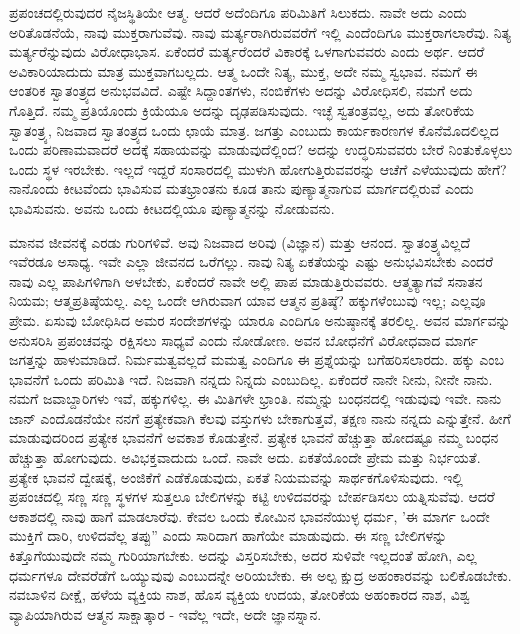 ಪ್ರಪಂಚದಲ್ಲಿರುವುದರ ನೈಜಸ್ಥಿತಿಯೇ ಆತ್ಮ. ಆದರೆ ಅದೆಂದಿಗೂ ಪರಿಮಿತಿಗೆ ಸಿಲುಕದು. ನಾವೇ ಅದು ಎಂದು ಅರಿತೊಡನೆಯೆ, ನಾವು ಮುಕ್ತರಾಗುವೆವು. ನಾವು ಮರ್ತ್ಯರಾಗಿರುವವರೆಗೆ ಇಲ್ಲಿ ಎಂದೆಂದಿಗೂ ಮುಕ್ತರಾಗಲಾರೆವು. ನಿತ್ಯ ಮರ್ತ್ಯರೆನ್ನುವುದು ವಿರೋಧಾಭಾಸ. ಏಕೆಂದರೆ ಮರ್ತ್ಯರೆಂದರೆ ವಿಕಾರಕ್ಕೆ ಒಳಗಾಗುವವರು ಎಂದು ಅರ್ಥ. ಆದರೆ ಅವಿಕಾರಿಯಾದುದು ಮಾತ್ರ ಮುಕ್ತವಾಗಬಲ್ಲದು. ಆತ್ಮ ಒಂದೇ ನಿತ್ಯ, ಮುಕ್ತ, ಅದೇ ನಮ್ಮ ಸ್ವಭಾವ. ನಮಗೆ ಈ ಆಂತರಿಕ ಸ್ವಾತಂತ್ರ್ಯದ ಅನುಭವವಿದೆ. ಎಷ್ಟೇ ಸಿದ್ದಾಂತಗಳು, ನಂಬಿಕೆಗಳು ಅದನ್ನು ವಿರೋಧಿಸಲಿ, ನಮಗೆ ಅದು ಗೊತ್ತಿದೆ. ನಮ್ಮ ಪ್ರತಿಯೊಂದು ಕ್ರಿಯೆಯೂ ಅದನ್ನು ದೃಢಪಡಿಸುವುದು. ಇಚ್ಛೆ ಸ್ವತಂತ್ರವಲ್ಲ, ಅದು ತೋರಿಕೆಯ ಸ್ವಾತಂತ್ರ್ಯ, ನಿಜವಾದ ಸ್ವಾತಂತ್ರ್ಯದ ಒಂದು ಛಾಯೆ ಮಾತ್ರ. ಜಗತ್ತು ಎಂಬುದು ಕಾರ್ಯಕಾರಣಗಳ ಕೊನೆಮೊದಲಿಲ್ಲದ ಒಂದು ಪರಿಣಾಮವಾದರೆ ಅದಕ್ಕೆ ಸಹಾಯವನ್ನು ಮಾಡುವುದೆಲ್ಲಿಂದ? ಅದನ್ನು ಉದ್ಧರಿಸುವವರು ಬೇರೆ ನಿಂತುಕೊಳ್ಳಲು ಒಂದು ಸ್ಥಳ ಇರಬೇಕು. ಇಲ್ಲದೆ ಇದ್ದರೆ ಸಂಸಾರದಲ್ಲಿ ಮುಳುಗಿ ಹೋಗುತ್ತಿರುವವರನ್ನು ಆಚೆಗೆ ಎಳೆಯುವುದು ಹೇಗೆ? ನಾನೊಂದು ಕೀಟವೆಂದು ಭಾವಿಸುವ ಮತಭ್ರಾಂತನು ಕೂಡ ತಾನು ಪುಣ್ಯಾತ್ಮನಾಗುವ ಮಾರ್ಗದಲ್ಲಿರುವೆ ಎಂದು ಭಾವಿಸುವನು. ಅವನು ಒಂದು ಕೀಟದಲ್ಲಿಯೂ ಪುಣ್ಯಾತ್ಮನನ್ನು ನೋಡುವನು.

ಮಾನವ ಜೀವನಕ್ಕೆ ಎರಡು ಗುರಿಗಳಿವೆ. ಅವು ನಿಜವಾದ ಅರಿವು (ವಿಜ್ಞಾನ) ಮತ್ತು ಆನಂದ. ಸ್ವಾತಂತ್ರ್ಯವಿಲ್ಲದೆ ಇವೆರಡೂ ಅಸಾಧ್ಯ. ಇವೇ ಎಲ್ಲಾ ಜೀವನದ ಒರೆಗಲ್ಲು. ನಾವು ನಿತ್ಯ ಏಕತೆಯನ್ನು ಎಷ್ಟು ಅನುಭವಿಸಬೇಕು ಎಂದರೆ ನಾವು ಎಲ್ಲ ಪಾಪಿಗಳಿಗಾಗಿ ಅಳಬೇಕು, ಏಕೆಂದರೆ ನಾವೇ ಅಲ್ಲಿ ಪಾಪ ಮಾಡುತ್ತಿರುವವರು. ಆತ್ಮತ್ಯಾಗವೆ ಸನಾತನ ನಿಯಮ; ಆತ್ಮಪ್ರತಿಷ್ಠೆಯಲ್ಲ. ಎಲ್ಲ ಒಂದೇ ಆಗಿರುವಾಗ ಯಾವ ಆತ್ಮನ ಪ್ರತಿಷ್ಠೆ? ಹಕ್ಕುಗಳೆಂಬುವು ಇಲ್ಲ; ಎಲ್ಲವೂ ಪ್ರೇಮ. ಏಸುವು ಬೋಧಿಸಿದ ಅಮರ ಸಂದೇಶಗಳನ್ನು ಯಾರೂ ಎಂದಿಗೂ ಅನುಷ್ಠಾನಕ್ಕೆ ತರಲಿಲ್ಲ. ಅವನ ಮಾರ್ಗವನ್ನು ಅನುಸರಿಸಿ ಪ್ರಪಂಚವನ್ನು ರಕ್ಷಿಸಲು ಸಾಧ್ಯವೆ ಎಂದು ನೋಡೋಣ. ಅವನ ಬೋಧನೆಗೆ ವಿರೋಧವಾದ ಮಾರ್ಗ ಜಗತ್ತನ್ನು ಹಾಳುಮಾಡಿದೆ. ನಿರ್ಮಮತ್ವವಲ್ಲದೆ ಮಮತ್ವ ಎಂದಿಗೂ ಈ ಪ್ರಶ್ನೆಯನ್ನು ಬಗೆಹರಿಸಲಾರದು. ಹಕ್ಕು ಎಂಬ ಭಾವನೆಗೆ ಒಂದು ಪರಿಮಿತಿ ಇದೆ. ನಿಜವಾಗಿ ನನ್ನದು ನಿನ್ನದು ಎಂಬುದಿಲ್ಲ. ಏಕೆಂದರೆ ನಾನೇ ನೀನು, ನೀನೇ ನಾನು. ನಮಗೆ ಜವಾಬ್ದಾರಿಗಳು ಇವೆ, ಹಕ್ಕುಗಳಿಲ್ಲ. ಈ ಮಿತಿಗಳೇ ಭ್ರಾಂತಿ. ನಮ್ಮನ್ನು ಬಂಧನದಲ್ಲಿ ಇಡುವುವು ಇವೇ. ನಾನು ಜಾನ್ ಎಂದೊಡನೆಯೇ ನನಗೆ ಪ್ರತ್ಯೇಕವಾಗಿ ಕೆಲವು ವಸ್ತುಗಳು ಬೇಕಾಗುತ್ತವೆ, ತಕ್ಷಣ ನಾನು ನನ್ನದು ಎನ್ನುತ್ತೇನೆ. ಹೀಗೆ ಮಾಡುವುದರಿಂದ ಪ್ರತ್ಯೇಕ ಭಾವನೆಗೆ ಅವಕಾಶ ಕೊಡುತ್ತೇನೆ. ಪ್ರತ್ಯೇಕ ಭಾವನೆ ಹೆಚ್ಚುತ್ತಾ ಹೋದಷ್ಟೂ ನಮ್ಮ ಬಂಧನ ಹೆಚ್ಚುತ್ತಾ ಹೋಗುವುದು. ಅವಿಭಕ್ತವಾದುದು ಒಂದೆ. ನಾವೇ ಅದು. ಏಕತೆಯೊಂದೇ ಪ್ರೇಮ ಮತ್ತು ನಿರ್ಭಯತೆ. ಪ್ರತ್ಯೇಕ ಭಾವನೆ ದ್ವೇಷಕ್ಕೆ, ಅಂಜಿಕೆಗೆ ಎಡೆಕೊಡುವುದು, ಏಕತೆ ನಿಯಮವನ್ನು ಸಾರ್ಥಕಗೊಳಿಸುವುದು. ಇಲ್ಲಿ ಪ್ರಪಂಚದಲ್ಲಿ ಸಣ್ಣ ಸಣ್ಣ ಸ್ಥಳಗಳ ಸುತ್ತಲೂ ಬೇಲಿಗಳನ್ನು ಕಟ್ಟಿ ಉಳಿದವರನ್ನು ಬೇರ್ಪಡಿಸಲು ಯತ್ನಿಸುವೆವು. ಆದರೆ ಆಕಾಶದಲ್ಲಿ ನಾವು ಹಾಗೆ ಮಾಡಲಾರೆವು. ಕೇವಲ ಒಂದು ಕೋಮಿನ ಭಾವನೆಯುಳ್ಳ ಧರ್ಮ, 'ಈ ಮಾರ್ಗ ಒಂದೇ ಮುಕ್ತಿಗೆ ದಾರಿ, ಉಳಿದವೆಲ್ಲ ತಪ್ಪು'' ಎಂದು ಸಾರಿದಾಗ ಹಾಗೆಯೇ ಮಾಡುವುದು. ಈ ಸಣ್ಣ ಬೇಲಿಗಳನ್ನು ಕಿತ್ತೊಗೆಯುವುದೇ ನಮ್ಮ ಗುರಿಯಾಗಬೇಕು. ಅದನ್ನು ವಿಸ್ತರಿಸಬೇಕು, ಅದರ ಸುಳಿವೇ ಇಲ್ಲದಂತೆ ಹೋಗಿ, ಎಲ್ಲ ಧರ್ಮಗಳೂ ದೇವರೆಡೆಗೆ ಒಯ್ಯುವುವು ಎಂಬುದನ್ನೇ ಅರಿಯಬೇಕು. ಈ ಅಲ್ಪ ಕ್ಷುದ್ರ ಅಹಂಕಾರವನ್ನು ಬಲಿಕೊಡಬೇಕು. ನವಬಾಳಿನ ದೀಕ್ಷೆ, ಹಳೆಯ ವ್ಯಕ್ತಿಯ ನಾಶ, ಹೊಸ ವ್ಯಕ್ತಿಯ ಉದಯ, ತೋರಿಕೆಯ ಅಹಂಕಾರದ ನಾಶ, ವಿಶ್ವ ವ್ಯಾಪಿಯಾಗಿರುವ ಆತ್ಮನ ಸಾಕ್ಷಾತ್ಕಾರ - ಇವೆಲ್ಲ ಇದೇ, ಅದೇ ಜ್ಞಾನಸ್ನಾನ.

